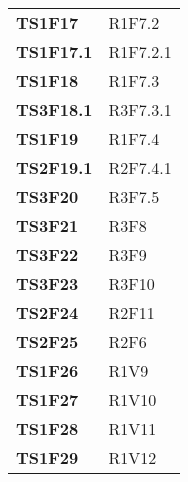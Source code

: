 {\begin{longtable}{C{2.5cm} | C{10cm} }
		\textbf{TS1F17} & R1F7.2\\
		\textbf{TS1F17.1} & R1F7.2.1\\
		\textbf{TS1F18} & R1F7.3\\
		\textbf{TS3F18.1} & R3F7.3.1\\
		\textbf{TS1F19} & R1F7.4\\
		\textbf{TS2F19.1} & R2F7.4.1\\
		\textbf{TS3F20} & R3F7.5\\
		\textbf{TS3F21} & R3F8\\
		\textbf{TS3F22} & R3F9\\
		\textbf{TS3F23} & R3F10\\
		\textbf{TS2F24} & R2F11\\
		\textbf{TS2F25} & R2F6\\
		\textbf{TS1F26} & R1V9\\
		\textbf{TS1F27} & R1V10\\
		\textbf{TS1F28} & R1V11\\
		\textbf{TS1F29} & R1V12\\

\end{longtable}
}